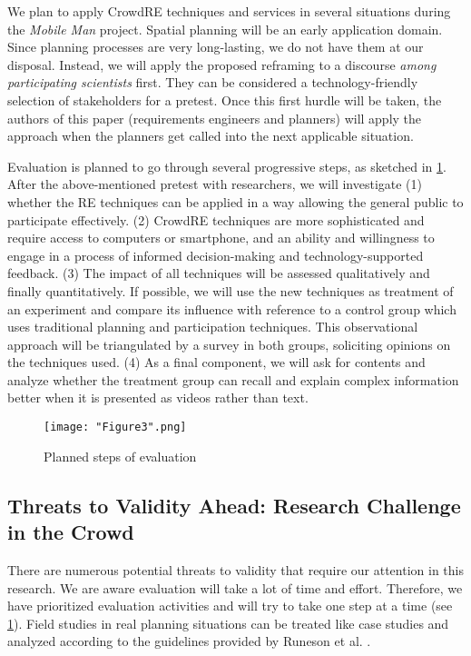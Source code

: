 \documentclass[conference]{IEEEtran}
\begin{document}
We plan to apply CrowdRE techniques and services in several situations during 
the \textit{Mobile Man} project. Spatial planning will be an early application 
domain. Since planning processes are very long-lasting, we do not have them at 
our disposal. Instead, we will apply the proposed reframing to a discourse 
\textit{among participating scientists} first. They can be considered a 
technology-friendly selection of stakeholders for a pretest. Once this first 
hurdle will be taken, the authors of this paper (requirements engineers and 
planners) will apply the approach when the planners get called into the next 
applicable situation.

Evaluation is planned to go through several progressive steps, as sketched in 
\figurename{ \ref{figure:3}}. After the above-mentioned pretest with 
researchers, we will investigate (1) whether the RE techniques can be applied 
in a way allowing the general public to participate effectively. 
(2) CrowdRE techniques are more sophisticated and require access to computers 
or smartphone, and an ability and willingness to engage in a process of 
informed decision-making and technology-supported feedback. (3) The impact of 
all techniques will be assessed qualitatively and finally quantitatively. If 
possible, we will use the new techniques as treatment of an experiment and 
compare its influence with reference to a control group which uses traditional 
planning and participation techniques. This observational approach will be 
triangulated by a survey in both groups, soliciting opinions on the techniques 
used. (4) As a final component, we will ask for contents and analyze whether 
the treatment group can recall and explain complex information better when it 
is presented as videos rather than text.

\begin{figure}[htbp]
	\centering
	\texttt{[image: "Figure3".png]}\hfill
	\caption{Planned steps of evaluation}
	\label{figure:3}
\end{figure}

\subsection{Threats to Validity Ahead: Research Challenge in the Crowd}
There are numerous potential threats to validity that require our attention in 
this research. We are aware evaluation will take a lot of time and effort. 
Therefore, we have prioritized evaluation activities and will try to take one 
step at a time (see \figurename{ \ref{figure:3}}). Field studies in real 
planning situations can be treated like case studies and analyzed according to 
the guidelines provided by Runeson et al. \cite{Runeson.2012}.
\end{document}

